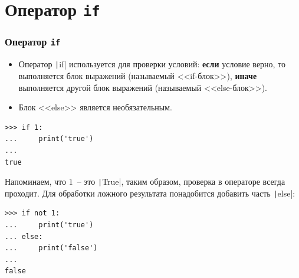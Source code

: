 \documentclass[aspectratio=169, mathserif]{beamer}	%
\begin{document}
\section{Оператор \texttt{if}}

\sectionframe	%

\begin{frame}[fragile]
\frametitle{Оператор \texttt{if}}
\scriptsize
\begin{itemize}
	\item Оператор \texttt|if| используется для проверки условий: \textbf{если} условие верно, то выполняется блок выражений (называемый <<if-блок>>), \textbf{иначе} выполняется другой блок выражений (называемый <<else-блок>>).
	
	\item Блок <<else>> является необязательным. 
\end{itemize}

\begin{verbatim}
>>> if 1:
...     print('true')
...
true
\end{verbatim}

Напоминаем, что $1$~-- это \texttt|True|, таким образом, проверка в операторе всегда проходит. Для обработки ложного результата понадобится добавить часть \texttt|else|:

\begin{verbatim}
>>> if not 1:
...     print('true')
... else:
...     print('false')
...
false
\end{verbatim}
\vfill
\end{frame}
\end{document}
